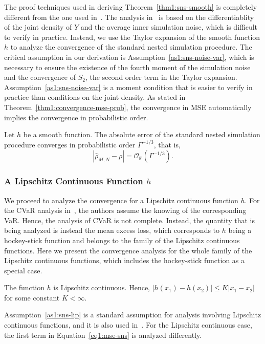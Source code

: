 The proof techniques used in deriving Theorem~\ref{thm1:sns-smooth} is completely different from the one used in~\cite{gordy2010nested}.
The analysis in~\cite{gordy2010nested} is based on the differentiablity of the joint density of $Y$ and the average inner simulation noise, which is difficult to verify in practice.
Instead, we use the Taylor expansion of the smooth function $h$ to analyze the convergence of the standard nested simulation procedure.
The critical assumption in our derivation is Assumption~\ref{as1:sns-noise-var}, which is necessary to ensure the existence of the fourth moment of the simulation noise and the convergence of $S_2$, the second order term in the Taylor expansion.
Assumption~\ref{as1:sns-noise-var} is a moment condition that is easier to verify in practice than conditions on the joint density.
As stated in Theorem~\ref{thm1:convergence-mse-prob}, the convergence in MSE automatically implies the convergence in probabilistic order.

\begin{corollary}
    Let $h$ be a smooth function. 
    The absolute error of the standard nested simulation procedure converges in probabilistic order $\Gamma^{-1/3}$, that is,
    $$\left| \hat{\rho}_{M, N} - \rho \right| = \mathcal{O}_\mathbb{P}(\Gamma^{-1/3}).$$
\end{corollary}

\subsubsection*{A Lipschitz Continuous Function $h$}
We proceed to analyze the convergence for a Lipschitz continuous function $h$.
For the CVaR analysis in~\cite{gordy2010nested}, the authors assume the knowing of the corresponding VaR.
Hence, the analysis of CVaR is not complete.
Instead, the quantity that is being analyzed is instead the mean excess loss, which corresponds to $h$ being a hockey-stick function and belongs to the family of the Lipschitz continuous functions. 
Here we present the convergence analysis for the whole family of the Lipschitz continuous functions, which includes the hockey-stick function as a special case. 

\begin{assumption} \label{as1:sns-lip}
    The function $h$ is Lipschitz continuous. Hence, $|h(x_1) - h(x_2)| \leq K|x_1 - x_2|$ for some constant $K< \infty$.
\end{assumption}
Assumption~\ref{as1:sns-lip} is a standard assumption for analysis involving Lipschitz continuous functions, and it is also used in~\cite{broadie2015risk}.
For the Lipschitz continuous case, the first term in Equation~\ref{eq1:mse-sns} is analyzed differently.

